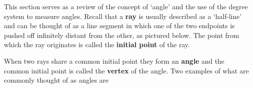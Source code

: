 \documentclass{ximera}
\begin{document}
	\author{Stitz-Zeager}




\setcounter{footnote}{0}

\label{AppAngles}

This section serves as a review of the concept of `angle' and the use of the degree system to measure angles.  Recall that a    \textbf{ray} is usually described as a `half-line' and can be thought of as a line segment in which one of the two endpoints is pushed off infinitely distant from the other, as pictured below.  The point from which the ray originates is called the  \textbf{initial point} of the ray.

\begin{image}
\end{image}

When two rays share a common initial point they form an  \textbf{angle} and the common initial point is called the \textbf{vertex} of the angle.  Two  examples of what are commonly thought of as angles are
\end{document}
